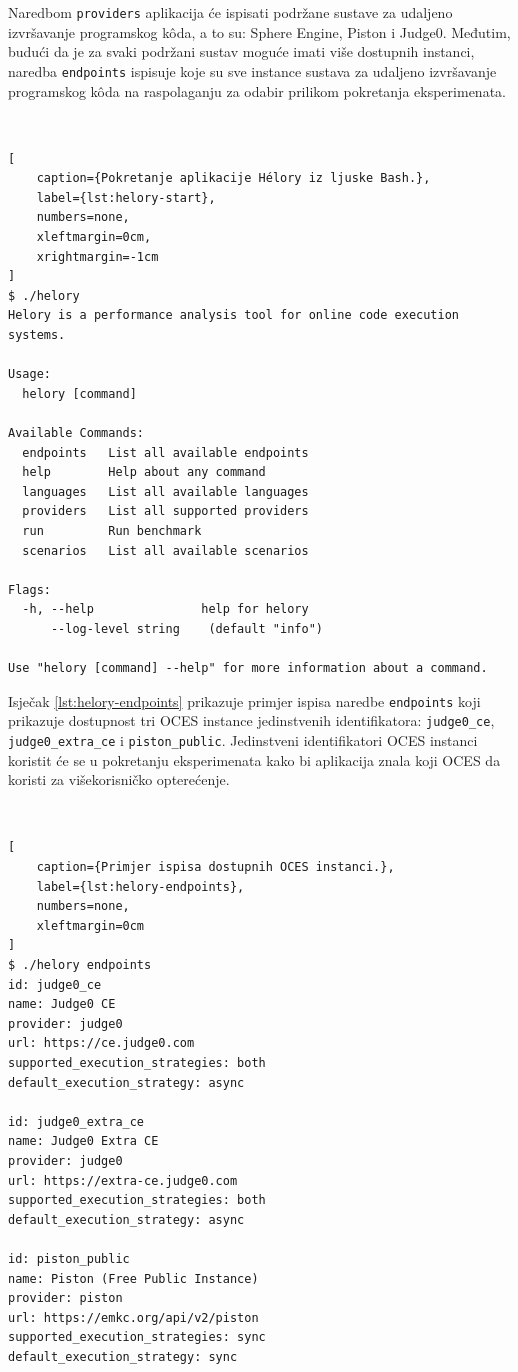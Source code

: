\documentclass[times, utf8, diplomski]{fer}
\begin{document}
Naredbom \lstinline{providers} aplikacija će ispisati podržane sustave za udaljeno izvršavanje programskog kôda, a to su: Sphere Engine, Piston i Judge0. Međutim, budući da je za svaki podržani sustav moguće imati više dostupnih instanci, naredba \lstinline{endpoints} ispisuje koje su sve instance sustava za udaljeno izvršavanje programskog kôda na raspolaganju za odabir prilikom pokretanja eksperimenata. 

\

\begin{lstlisting}[
    caption={Pokretanje aplikacije Hélory iz ljuske Bash.},
    label={lst:helory-start},
    numbers=none,
    xleftmargin=0cm,
    xrightmargin=-1cm
]
$ ./helory
Helory is a performance analysis tool for online code execution systems.

Usage:
  helory [command]

Available Commands:
  endpoints   List all available endpoints
  help        Help about any command
  languages   List all available languages
  providers   List all supported providers
  run         Run benchmark
  scenarios   List all available scenarios

Flags:
  -h, --help               help for helory
      --log-level string    (default "info")

Use "helory [command] --help" for more information about a command.
\end{lstlisting}

\pagebreak

Isječak \ref{lst:helory-endpoints} prikazuje primjer ispisa naredbe \lstinline{endpoints} koji prikazuje dostupnost tri OCES instance jedinstvenih identifikatora: \lstinline{judge0_ce}, \lstinline{judge0_extra_ce} i \lstinline{piston_public}. Jedinstveni identifikatori OCES instanci koristit će se u pokretanju eksperimenata kako bi aplikacija znala koji OCES da koristi za višekorisničko opterećenje.

\

\begin{lstlisting}[
    caption={Primjer ispisa dostupnih OCES instanci.},
    label={lst:helory-endpoints},
    numbers=none,
    xleftmargin=0cm
]
$ ./helory endpoints
id: judge0_ce
name: Judge0 CE
provider: judge0
url: https://ce.judge0.com
supported_execution_strategies: both
default_execution_strategy: async

id: judge0_extra_ce
name: Judge0 Extra CE
provider: judge0
url: https://extra-ce.judge0.com
supported_execution_strategies: both
default_execution_strategy: async

id: piston_public
name: Piston (Free Public Instance)
provider: piston
url: https://emkc.org/api/v2/piston
supported_execution_strategies: sync
default_execution_strategy: sync
\end{lstlisting}
\end{document}
